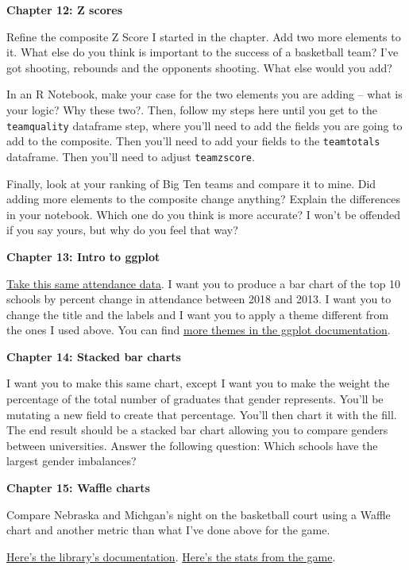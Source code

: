 \documentclass[]{book}
\begin{document}
\textbf{Chapter 12: Z scores}

Refine the composite Z Score I started in the chapter. Add two more elements to it. What else do you think is important to the success of a basketball team? I've got shooting, rebounds and the opponents shooting. What else would you add?

In an R Notebook, make your case for the two elements you are adding -- what is your logic? Why these two?. Then, follow my steps here until you get to the \texttt{teamquality} dataframe step, where you'll need to add the fields you are going to add to the composite. Then you'll need to add your fields to the \texttt{teamtotals} dataframe. Then you'll need to adjust \texttt{teamzscore}.

Finally, look at your ranking of Big Ten teams and compare it to mine. Did adding more elements to the composite change anything? Explain the differences in your notebook. Which one do you think is more accurate? I won't be offended if you say yours, but why do you feel that way?

\textbf{Chapter 13: Intro to ggplot}

\href{https://unl.box.com/s/hvxmnxhr41x4ikgt3vk38aczcbrf97pn}{Take this same attendance data}. I want you to produce a bar chart of the top 10 schools by percent change in attendance between 2018 and 2013. I want you to change the title and the labels and I want you to apply a theme different from the ones I used above. You can find \href{https://ggplot2.tidyverse.org/reference/ggtheme.html}{more themes in the ggplot documentation}.

\textbf{Chapter 14: Stacked bar charts}

I want you to make this same chart, except I want you to make the weight the percentage of the total number of graduates that gender represents. You'll be mutating a new field to create that percentage. You'll then chart it with the fill. The end result should be a stacked bar chart allowing you to compare genders between universities. Answer the following question: Which schools have the largest gender imbalances?

\textbf{Chapter 15: Waffle charts}

Compare Nebraska and Michgan's night on the basketball court using a Waffle chart and another metric than what I've done above for the game.

\href{https://github.com/hrbrmstr/waffle}{Here's the library's documentation}.
\href{https://www.sports-reference.com/cbb/boxscores/2019-02-28-19-michigan.html}{Here's the stats from the game}.
\end{document}
